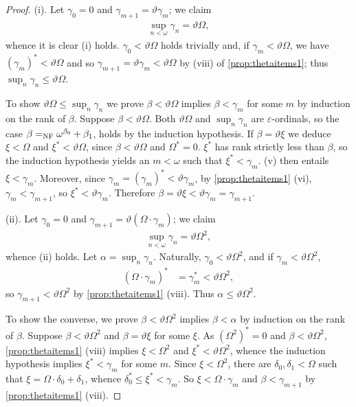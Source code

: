 \documentclass[UKenglish,cleveref,DIV=12]{scrartcl}
\theoremstyle{definition}
\theoremstyle{definition}
\begin{document}
\begin{proof}
(i). Let $\gamma_0=0$ and $\gamma_{m+1}=\vartheta\gamma_m$; we claim
\begin{align*}
 \sup_{n<\omega}\gamma_n=\vartheta\Omega,
\end{align*}
whence it is clear (i) holds. $\gamma_0<\vartheta\Omega$ holds trivially and, if $\gamma_m<\vartheta\Omega$, we have $(\gamma_m)^*<\vartheta\Omega$ and so $\gamma_{m+1}=\vartheta\gamma_m<\vartheta\Omega$ by (viii) of \cref{prop:thetaitems1}; thus $\sup_{n}\gamma_n\le\vartheta\Omega$.

To show $\vartheta\Omega\le\sup_n\gamma_n$ we prove $\beta<\vartheta\Omega$
implies $\beta<\gamma_m$ for some $m$ by induction on the rank of $\beta$. Suppose $\beta<\vartheta\Omega$. Both
$\vartheta\Omega$ and $\sup_n\gamma_n$ are $\varepsilon$-ordinals, so the case
$\beta=_{\mathrm{NF}}\omega^{\beta_0}+\beta_1$, holds by the induction hypothesis. If
$\beta=\vartheta\xi$ we deduce $\xi<\Omega$ and $\xi^*<\vartheta\Omega$, since
$\beta<\vartheta\Omega$ and $\Omega^*=0$. $\xi^*$ has rank strictly less than
$\beta$, so the induction hypothesis yields an $m<\omega$ such that
$\xi^*<\gamma_m$.  (v) then entails $\xi<\gamma_m$.
Moreover, since $\gamma_m=(\gamma_m)^*<\vartheta\gamma_m$, by \cref{prop:thetaitems1} (vi), $\gamma_m<\gamma_{m+1}$, so $\xi^*<\vartheta\gamma_{m}$. Therefore $\beta=\vartheta\xi<\vartheta\gamma_m=\gamma_{m+1}$.

(ii). Let $\gamma_0=0$ and $\gamma_{m+1}=\vartheta(\Omega\cdot\gamma_m)$; we claim
\begin{align*}
 \sup_{n<\omega}\gamma_n=\vartheta\Omega^2,
\end{align*}
whence (ii) holds.
Let $\alpha=\sup_n\gamma_n$. Naturally, $\gamma_0< \vartheta\Omega^2$, and if $\gamma_m<\vartheta\Omega^2$,
\begin{align*}
 (\Omega\cdot\gamma_m)^* %
	&=\gamma_m^*<\vartheta\Omega^2,
\end{align*}
so $\gamma_{m+1}<\vartheta\Omega^2$ by \cref{prop:thetaitems1} (viii). Thus $\alpha\le\vartheta\Omega^2$.

To show the converse, we prove $\beta<\vartheta\Omega^2$ implies $\beta<\alpha$ by induction on the rank of $\beta$. Suppose $\beta<\vartheta\Omega^2$ and $\beta=\vartheta\xi$
for some $\xi$. As $(\Omega^2)^*=0$ and $\beta<\vartheta\Omega^2$,
\cref{prop:thetaitems1} (viii) implies $\xi<\Omega^2$ and
$\xi^*<\vartheta\Omega^2$, whence the induction hypothesis implies
$\xi^*<\gamma_m$ for some $m$. Since $\xi<\Omega^2$, there are $\delta_0,\delta_1<\Omega$ such that $\xi=\Omega\cdot\delta_0+\delta_1$, whence $\delta_0^*\le\xi^*<\gamma_m$. So $\xi<\Omega\cdot\gamma_m$
and $\beta<\gamma_{m+1}$ by \cref{prop:thetaitems1} (viii).


\end{proof}
\end{document}
